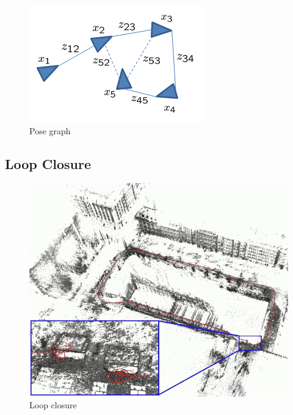 \begin{figure}[ht]
	\centering
	\includegraphics[width=\linewidth]{assets/img/pose-graph.png}
	\caption{Pose graph}%
	\label{fig:pose-graph}
\end{figure}

\subsection{Loop Closure}%
\label{sub:loop-closure}

\begin{figure}[ht]
	\centering
	\includegraphics[width=\linewidth]{assets/img/loop-closure-lowres.png}
	\caption{Loop closure}%
	\label{fig:loop-closure}
\end{figure}
